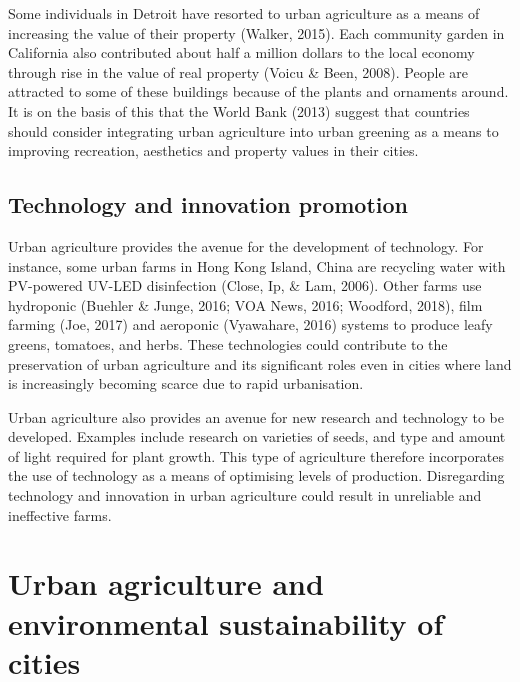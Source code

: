 Some individuals in Detroit have resorted to urban agriculture as a means of increasing the value of their property (Walker, 2015). Each community garden in California also contributed about half a million dollars to the local economy through rise in the value of real property (Voicu \& Been, 2008). People are attracted to some of these buildings because of the plants and ornaments around. It is on the basis of this that the World Bank (2013) suggest that countries should consider integrating urban agriculture into urban greening as a means to improving recreation, aesthetics and property values in their cities.

\subsection{Technology and innovation promotion}

Urban agriculture provides the avenue for the development of technology. For instance, some urban farms in Hong Kong Island, China are recycling water with PV-powered UV-LED disinfection (Close, Ip, \& Lam, 2006). Other farms use hydroponic (Buehler \& Junge, 2016; VOA News, 2016; Woodford, 2018), film farming (Joe, 2017) and aeroponic (Vyawahare, 2016) systems to produce leafy greens, tomatoes, and herbs. These technologies could contribute to the preservation of urban agriculture and its significant roles even in cities where land is increasingly becoming scarce due to rapid urbanisation.

Urban agriculture also provides an avenue for new research and technology to be developed. Examples include research on varieties of seeds, and type and amount of light required for plant growth. This type of agriculture therefore incorporates the use of technology as a means of optimising levels of production. Disregarding technology and innovation in urban agriculture could result in unreliable and ineffective farms.

\section{Urban agriculture and environmental sustainability of cities}




